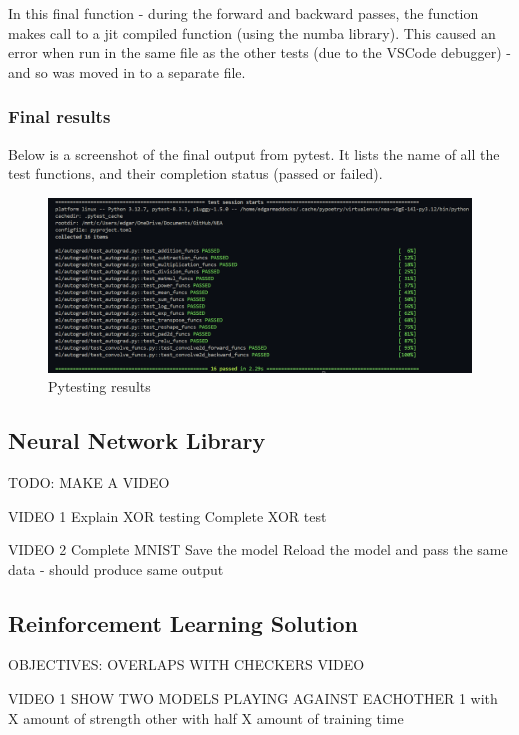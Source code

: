 \documentclass{article}
\begin{document}
    In this final function - during the forward and backward passes, the function makes call to 
    a jit compiled function (using the numba library). This caused an error when run in
    the same file as the other tests (due to the VSCode debugger) - and so was moved in to a separate file.

    \subsubsection{Final results}

    Below is a screenshot of the final output from pytest. It lists the name of all the test functions,
    and their completion status (passed or failed).

    \begin{figure}[h]
        \centering
        \includegraphics[scale=0.5]{passing_tests.png}
        \caption{Pytesting results}
    \end{figure}
     
    \subsection{Neural Network Library}

    TODO: MAKE A VIDEO

    VIDEO 1
    Explain XOR testing
    Complete XOR test

    VIDEO 2
    Complete MNIST
    Save the model
    Reload the model and pass the same data - should produce same output

    \subsection{Reinforcement Learning Solution}

    OBJECTIVES:
    OVERLAPS WITH CHECKERS VIDEO

    VIDEO 1
    SHOW TWO MODELS PLAYING AGAINST EACHOTHER
    1 with X amount of strength other with half X amount of training time
\end{document}
